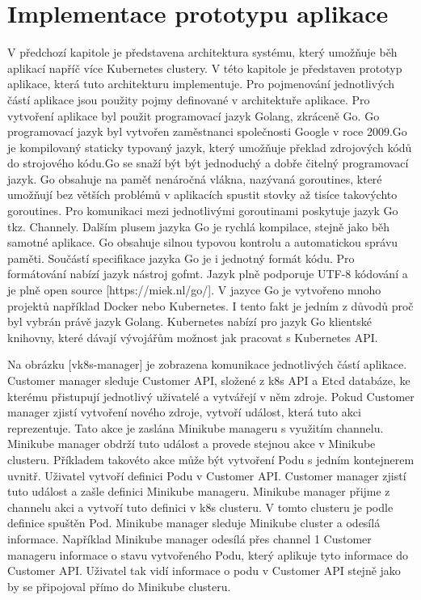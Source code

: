 \chapter{Implementace prototypu aplikace}
V předchozí kapitole je představena architektura systému, který umožňuje běh aplikací napříč více Kubernetes clustery. V této kapitole je představen prototyp aplikace, která tuto architekturu implementuje. Pro pojmenování jednotlivých částí aplikace jsou použity pojmy definované v architektuře aplikace. Pro vytvoření aplikace byl použit programovací jazyk Golang, zkráceně Go. Go programovací jazyk byl vytvořen zaměstnanci společnosti Google v roce 2009.Go je kompilovaný staticky typovaný jazyk, který umožňuje překlad zdrojových kódů do strojového kódu.Go se snaží být být jednoduchý a dobře čitelný programovací jazyk. Go obsahuje na paměť nenáročná vlákna, nazývaná goroutines, které umožňují bez větších problémů v aplikacích spustit stovky až tisíce takovýchto goroutines. Pro komunikaci mezi jednotlivými goroutinami poskytuje jazyk Go tkz. Channely. Dalším plusem jazyka Go je rychlá kompilace, stejně jako běh samotné aplikace. Go obsahuje silnou typovou kontrolu a automatickou správu paměti. Součástí specifikace jazyka Go je i jednotný formát kódu. Pro formátování nabízí jazyk nástroj gofmt. Jazyk plně podporuje UTF-8 kódování a je plně open source [https://miek.nl/go/]. V jazyce Go je vytvořeno mnoho projektů například Docker nebo Kubernetes. I tento fakt je jedním z důvodů proč byl vybrán právě jazyk Golang. Kubernetes nabízí pro jazyk Go klientské knihovny, které dávají vývojářům možnost jak pracovat s Kubernetes API.\par
    Na obrázku [vk8s-manager] je zobrazena komunikace jednotlivých částí aplikace. Customer manager sleduje Customer API, složené z k8s API a Etcd databáze, ke kterému přistupují jednotlivý uživatelé a vytvářejí v něm zdroje. Pokud Customer manager zjistí vytvoření nového zdroje, vytvoří událost, která tuto akci reprezentuje. Tato akce je zaslána Minikube manageru s využitím channelu. Minikube manager obdrží tuto událost a provede stejnou akce v Minikube clusteru. Příkladem takovéto akce může být vytvoření Podu s jedním kontejnerem uvnitř. Uživatel vytvoří definici Podu v Customer API. Customer manager zjistí tuto událost a zašle definici Minikube manageru. Minikube manager přijme z channelu akci a vytvoří tuto definici v k8s clusteru. V tomto clusteru je podle definice spuštěn Pod. Minikube manager sleduje Minikube cluster a odesílá informace. Například Minikube manager odesílá přes channel 1 Customer manageru informace o stavu vytvořeného Podu, který aplikuje tyto informace do Customer API. Uživatel tak vidí informace o podu v Customer API stejně jako by se připojoval přímo do Minikube clusteru.\par


